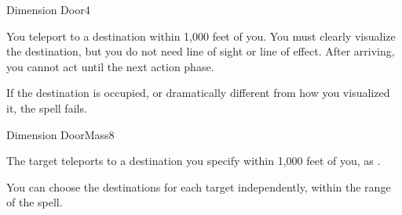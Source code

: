 \begin{spellsection}{Dimension Door}{4}
\begin{spellheader}
\end{spellheader}
\begin{spellcontent}
    \begin{spelltargetinginfo}
    \end{spelltargetinginfo}
    \begin{spelleffects}
        \spelleffect You teleport to a destination within 1,000 feet of you. You must clearly visualize the destination, but you do not need line of sight or line of effect. After arriving, you cannot act until the next action phase.

        If the destination is occupied, or dramatically different from how you visualized it, the spell fails.
    \end{spelleffects}
\end{spellcontent}
\begin{spellfooter}
\end{spellfooter}
\end{spellsection}

\begin{spellsection}{Dimension Door}{Mass}{8}
\begin{spellheader}
\end{spellheader}
\begin{spellcontent}
    \begin{spelltargetinginfo}
        \spellrng{\rngmed}
    \end{spelltargetinginfo}
    \begin{spelleffects}
        \spelleffect The target teleports to a destination you specify within 1,000 feet of you, as .
    \end{spelleffects}
\end{spellcontent}
\begin{spellfooter}
    \spellnotes You can choose the destinations for each target independently, within the range of the spell. 
\end{spellfooter}
\end{spellsection}


